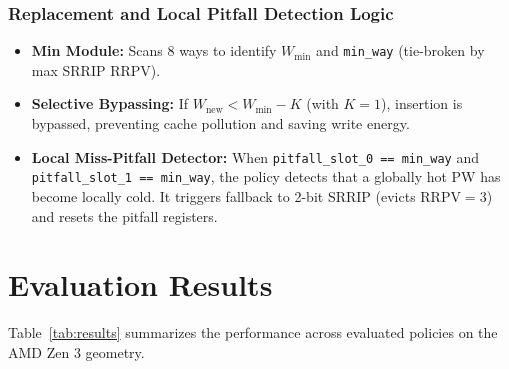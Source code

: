 \documentclass[10pt,twocolumn]{article}
\begin{document}
\subsubsection{Replacement and Local Pitfall Detection Logic}
\begin{itemize}
    \item \textbf{Min Module:} Scans 8 ways to identify $W_{\min}$ and \texttt{min\_way} (tie-broken by max SRRIP RRPV).
    \item \textbf{Selective Bypassing:} If $W_{\text{new}} < W_{\min} - K$ (with $K=1$), insertion is bypassed, preventing cache pollution and saving write energy.
    \item \textbf{Local Miss-Pitfall Detector:} When \texttt{pitfall\_slot\_0 == min\_way} and \texttt{pitfall\_slot\_1 == min\_way}, the policy detects that a globally hot PW has become locally cold. It triggers fallback to 2-bit SRRIP (evicts $\text{RRPV} = 3$) and resets the pitfall registers.
\end{itemize}

\section{Evaluation Results}

Table~\ref{tab:results} summarizes the performance across evaluated policies on the AMD Zen 3 geometry.

\begin{table}[h]
\centering
\caption{Micro-op Cache Policy Comparison (Zen 3 Geometry)}
\label{tab:results}
\end{table}
\end{document}
